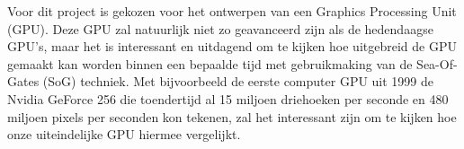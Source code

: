 Voor dit project is gekozen voor het ontwerpen van een Graphics Processing Unit (GPU). Deze GPU zal natuurlijk niet zo geavanceerd zijn als de hedendaagse GPU's, maar het is interessant en uitdagend om te kijken hoe uitgebreid de GPU gemaakt kan worden binnen een bepaalde tijd met gebruikmaking van de Sea-Of-Gates (SoG) techniek. Met bijvoorbeeld de eerste computer GPU uit 1999 de Nvidia GeForce 256 die toendertijd al 15 miljoen driehoeken per seconde en 480 miljoen pixels per seconden kon tekenen, zal het interessant zijn om te kijken hoe onze uiteindelijke GPU hiermee vergelijkt.